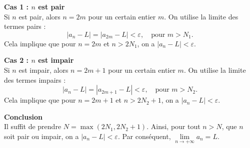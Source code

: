\documentclass{report}
\begin{document}
\textbf{Cas 1 : $n$ est pair} \\
Si $n$ est pair, alors $n = 2m$ pour un certain entier $m$. On utilise la limite 
des termes pairs :
\[
|a_n - L| = |a_{2m} - L| < \varepsilon, \quad \text{pour } m > N_1.
\]
Cela implique que pour $n = 2m$ et $n > 2N_1$, on a $|a_n - L| < \varepsilon$.

\textbf{Cas 2 : $n$ est impair} \\
Si $n$ est impair, alors $n = 2m + 1$ pour un certain entier $m$. On utilise la 
limite des termes impairs :
\[
|a_n - L| = |a_{2m+1} - L| < \varepsilon, \quad \text{pour } m > N_2.
\]
Cela implique que pour $n = 2m + 1$ et $n > 2N_2 + 1$, on a $|a_n - L| < 
\varepsilon$.

\textbf{Conclusion} \\
Il suffit de prendre $N = \max(2N_1, 2N_2 + 1)$. Ainsi, pour tout $n > N$, que 
$n$ soit pair ou impair, on a $|a_n - L| < \varepsilon$. Par conséquent, 
$\lim\limits_{n \to +\infty} a_n = L$.
\end{document}
